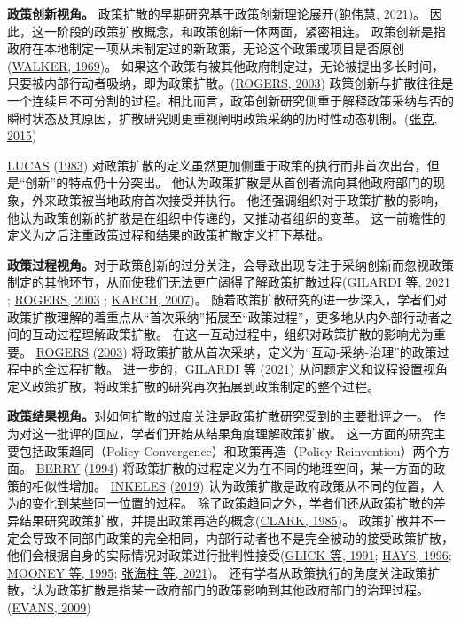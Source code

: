 \documentclass[
  12pt,
]{ctexart}
\begin{document}
\textbf{政策创新视角。}
政策扩散的早期研究基于政策创新理论展开(\protect\hyperlink{ref-BaoWeiHui2021}{鲍伟慧, 2021})。
因此，这一阶段的政策扩散概念，和政策创新一体两面，紧密相连。
政策创新是指政府在本地制定一项从未制定过的新政策，无论这个政策或项目是否原创(\protect\hyperlink{ref-Walker1969}{WALKER, 1969})。
如果这个政策有被其他政府制定过，无论被提出多长时间，只要被内部行动者吸纳，即为政策扩散。(\protect\hyperlink{ref-Rogers2003}{ROGERS, 2003})
政策创新与扩散往往是一个连续且不可分割的过程。相比而言，政策创新研究侧重于解释政策采纳与否的瞬时状态及其原因，扩散研究则更重视阐明政策采纳的历时性动态机制。(\protect\hyperlink{ref-ZhangKe2015}{张克, 2015})

\protect\hyperlink{ref-Lucas1983}{LUCAS} (\protect\hyperlink{ref-Lucas1983}{1983}) 对政策扩散的定义虽然更加侧重于政策的执行而非首次出台，但是``创新''的特点仍十分突出。
他认为政策扩散是从首创者流向其他政府部门的现象，外来政策被当地政府首次接受并执行。
他还强调组织对于政策扩散的影响，他认为政策创新的扩散是在组织中传递的，又推动者组织的变革。
这一前瞻性的定义为之后注重政策过程和结果的政策扩散定义打下基础。

\textbf{政策过程视角。}对于政策创新的过分关注，会导致出现专注于采纳创新而忽视政策制定的其他环节，从而使我们无法更广阔得了解政策扩散过程(\protect\hyperlink{ref-GilardiEtAl2021}{GILARDI 等, 2021} ; \protect\hyperlink{ref-Rogers2003}{ROGERS, 2003} ; \protect\hyperlink{ref-Karch2007}{KARCH, 2007})。
随着政策扩散研究的进一步深入，学者们对政策扩散理解的着重点从``首次采纳''拓展至``政策过程''，更多地从内外部行动者之间的互动过程理解政策扩散。
在这一互动过程中，组织对政策扩散的影响尤为重要。
\protect\hyperlink{ref-Rogers2003}{ROGERS} (\protect\hyperlink{ref-Rogers2003}{2003}) 将政策扩散从首次采纳，定义为``互动-采纳-治理''的政策过程中的全过程扩散。
进一步的，\protect\hyperlink{ref-GilardiEtAl2021}{GILARDI 等} (\protect\hyperlink{ref-GilardiEtAl2021}{2021}) 从问题定义和议程设置视角定义政策扩散，将政策扩散的研究再次拓展到政策制定的整个过程。

\textbf{政策结果视角。}对如何扩散的过度关注是政策扩散研究受到的主要批评之一。
作为对这一批评的回应，学者们开始从结果角度理解政策扩散。
这一方面的研究主要包括政策趋同（Policy Convergence）和政策再造（Policy Reinvention）两个方面。
\protect\hyperlink{ref-Berry1994}{BERRY} (\protect\hyperlink{ref-Berry1994}{1994}) 将政策扩散的过程定义为在不同的地理空间，某一方面的政策的相似性增加。
\protect\hyperlink{ref-Inkeles2019}{INKELES} (\protect\hyperlink{ref-Inkeles2019}{2019}) 认为政策扩散是政府政策从不同的位置，人为的变化到某些同一位置的过程。
除了政策趋同之外，学者们还从政策扩散的差异结果研究政策扩散，并提出政策再造的概念(\protect\hyperlink{ref-Clark1985}{CLARK, 1985})。
政策扩散并不一定会导致不同部门政策的完全相同，内部行动者也不是完全被动的接受政策扩散，他们会根据自身的实际情况对政策进行批判性接受(\protect\hyperlink{ref-GlickHays1991}{GLICK 等, 1991}; \protect\hyperlink{ref-Hays1996}{HAYS, 1996}; \protect\hyperlink{ref-MooneyLee1995}{MOONEY 等, 1995}; \protect\hyperlink{ref-ZhangHaiZhuLinHuaJing2021}{张海柱 等, 2021})。
还有学者从政策执行的角度关注政策扩散，认为政策扩散是指某一政府部门的政策影响到其他政府部门的治理过程。(\protect\hyperlink{ref-Evans2009}{EVANS, 2009})
\end{document}
